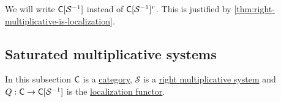 \documentclass[../../main]{subfiles}
\begin{document}
\begin{notation}
  We will write \(\mathsf{C}[\mathcal{S}^{-1}]\) instead of \(\mathsf{C}[\mathcal{S}^{-1}]^{r}\).
  This is justified by \autoref{thm:right-multiplicative-is-localization}.
\end{notation}

\subsection{Saturated multiplicative systems}
In this subsection \(\mathsf{C}\) is a \hyperref[def:category]{category}, \(\mathcal{S}\) is a \hyperref[def:multiplicative-system]{right multiplicative system} and \(Q: \mathsf{C} \to \mathsf{C}[\mathcal{S}^{-1}]\) is the \hyperref[def:localization-category]{localization functor}.
\end{document}
